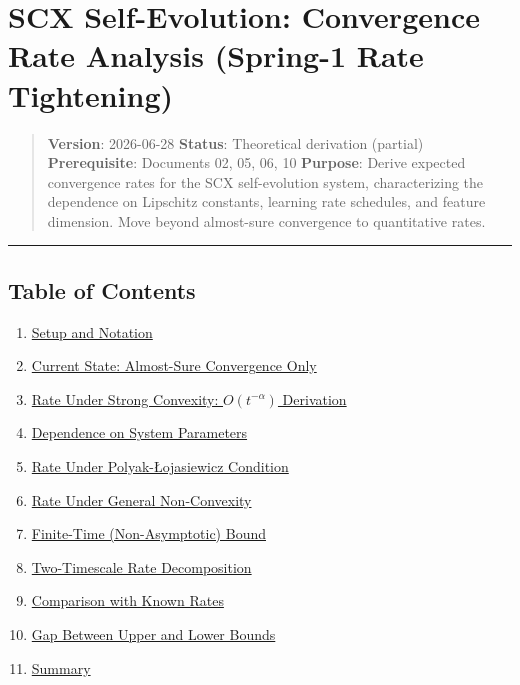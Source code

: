\documentclass[
  12pt,
]{ctexart}
\author{SCX}
\date{2026}
\providecommand{\tightlist}{%
  \setlength{\itemsep}{0pt}\setlength{\parskip}{0pt}}
\begin{document}
\section{SCX Self-Evolution: Convergence Rate Analysis (Spring-1 Rate
Tightening)}\label{scx-self-evolution-convergence-rate-analysis-spring-1-rate-tightening}

\begin{quote}
\textbf{Version}: 2026-06-28 \textbar{} \textbf{Status}: Theoretical
derivation (partial) \textbar{} \textbf{Prerequisite}: Documents 02, 05,
06, 10 \textbf{Purpose}: Derive expected convergence rates for the SCX
self-evolution system, characterizing the dependence on Lipschitz
constants, learning rate schedules, and feature dimension. Move beyond
almost-sure convergence to quantitative rates.
\end{quote}

\begin{center}\rule{0.5\linewidth}{0.5pt}\end{center}

\subsection{Table of Contents}\label{table-of-contents}

\begin{enumerate}
\def\labelenumi{\arabic{enumi}.}
\tightlist
\item
  \hyperref[1-setup-and-notation]{Setup and Notation}
\item
  \hyperref[2-current-state-almost-sure-convergence-only]{Current State:
  Almost-Sure Convergence Only}
\item
  \hyperref[3-rate-under-strong-convexity-ot-alpha-derivation]{Rate
  Under Strong Convexity: \(O(t^{-\alpha})\) Derivation}
\item
  \hyperref[4-dependence-on-system-parameters]{Dependence on System
  Parameters}
\item
  \hyperref[5-rate-under-polyak-lojasiewicz-condition]{Rate Under
  Polyak-Łojasiewicz Condition}
\item
  \hyperref[6-rate-under-general-non-convexity]{Rate Under General
  Non-Convexity}
\item
  \hyperref[7-finite-time-non-asymptotic-bound]{Finite-Time
  (Non-Asymptotic) Bound}
\item
  \hyperref[8-two-timescale-rate-decomposition]{Two-Timescale Rate
  Decomposition}
\item
  \hyperref[9-comparison-with-known-rates]{Comparison with Known Rates}
\item
  \hyperref[10-gap-between-upper-and-lower-bounds]{Gap Between Upper and
  Lower Bounds}
\item
  \hyperref[11-summary]{Summary}
\end{enumerate}
\end{document}
